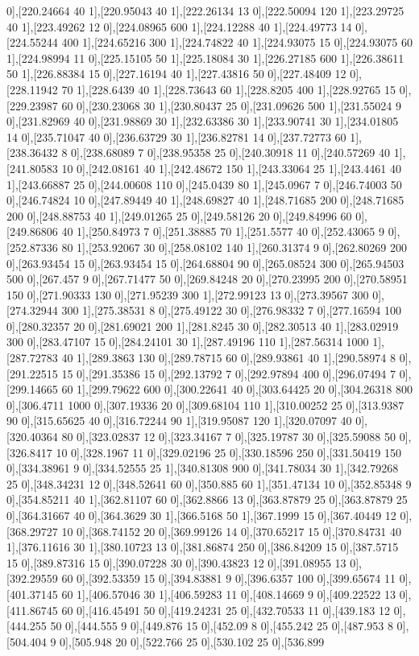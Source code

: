 {0],[220.24664 40 1],[220.95043 40 1],[222.26134 13 0],[222.50094 120 1],[223.29725 40 1],[223.49262 12 0],[224.08965 600 1],[224.12288 40 1],[224.49773 14 0],[224.55244 400 1],[224.65216 300 1],[224.74822 40 1],[224.93075 15 0],[224.93075 60 1],[224.98994 11 0],[225.15105 50 1],[225.18084 30 1],[226.27185 600 1],[226.38611 50 1],[226.88384 15 0],[227.16194 40 1],[227.43816 50 0],[227.48409 12 0],[228.11942 70 1],[228.6439 40 1],[228.73643 60 1],[228.8205 400 1],[228.92765 15 0],[229.23987 60 0],[230.23068 30 1],[230.80437 25 0],[231.09626 500 1],[231.55024 9 0],[231.82969 40 0],[231.98869 30 1],[232.63386 30 1],[233.90741 30 1],[234.01805 14 0],[235.71047 40 0],[236.63729 30 1],[236.82781 14 0],[237.72773 60 1],[238.36432 8 0],[238.68089 7 0],[238.95358 25 0],[240.30918 11 0],[240.57269 40 1],[241.80583 10 0],[242.08161 40 1],[242.48672 150 1],[243.33064 25 1],[243.4461 40 1],[243.66887 25 0],[244.00608 110 0],[245.0439 80 1],[245.0967 7 0],[246.74003 50 0],[246.74824 10 0],[247.89449 40 1],[248.69827 40 1],[248.71685 200 0],[248.71685 200 0],[248.88753 40 1],[249.01265 25 0],[249.58126 20 0],[249.84996 60 0],[249.86806 40 1],[250.84973 7 0],[251.38885 70 1],[251.5577 40 0],[252.43065 9 0],[252.87336 80 1],[253.92067 30 0],[258.08102 140 1],[260.31374 9 0],[262.80269 200 0],[263.93454 15 0],[263.93454 15 0],[264.68804 90 0],[265.08524 300 0],[265.94503 500 0],[267.457 9 0],[267.71477 50 0],[269.84248 20 0],[270.23995 200 0],[270.58951 150 0],[271.90333 130 0],[271.95239 300 1],[272.99123 13 0],[273.39567 300 0],[274.32944 300 1],[275.38531 8 0],[275.49122 30 0],[276.98332 7 0],[277.16594 100 0],[280.32357 20 0],[281.69021 200 1],[281.8245 30 0],[282.30513 40 1],[283.02919 300 0],[283.47107 15 0],[284.24101 30 1],[287.49196 110 1],[287.56314 1000 1],[287.72783 40 1],[289.3863 130 0],[289.78715 60 0],[289.93861 40 1],[290.58974 8 0],[291.22515 15 0],[291.35386 15 0],[292.13792 7 0],[292.97894 400 0],[296.07494 7 0],[299.14665 60 1],[299.79622 600 0],[300.22641 40 0],[303.64425 20 0],[304.26318 800 0],[306.4711 1000 0],[307.19336 20 0],[309.68104 110 1],[310.00252 25 0],[313.9387 90 0],[315.65625 40 0],[316.72244 90 1],[319.95087 120 1],[320.07097 40 0],[320.40364 80 0],[323.02837 12 0],[323.34167 7 0],[325.19787 30 0],[325.59088 50 0],[326.8417 10 0],[328.1967 11 0],[329.02196 25 0],[330.18596 250 0],[331.50419 150 0],[334.38961 9 0],[334.52555 25 1],[340.81308 900 0],[341.78034 30 1],[342.79268 25 0],[348.34231 12 0],[348.52641 60 0],[350.885 60 1],[351.47134 10 0],[352.85348 9 0],[354.85211 40 1],[362.81107 60 0],[362.8866 13 0],[363.87879 25 0],[363.87879 25 0],[364.31667 40 0],[364.3629 30 1],[366.5168 50 1],[367.1999 15 0],[367.40449 12 0],[368.29727 10 0],[368.74152 20 0],[369.99126 14 0],[370.65217 15 0],[370.84731 40 1],[376.11616 30 1],[380.10723 13 0],[381.86874 250 0],[386.84209 15 0],[387.5715 15 0],[389.87316 15 0],[390.07228 30 0],[390.43823 12 0],[391.08955 13 0],[392.29559 60 0],[392.53359 15 0],[394.83881 9 0],[396.6357 100 0],[399.65674 11 0],[401.37145 60 1],[406.57046 30 1],[406.59283 11 0],[408.14669 9 0],[409.22522 13 0],[411.86745 60 0],[416.45491 50 0],[419.24231 25 0],[432.70533 11 0],[439.183 12 0],[444.255 50 0],[444.555 9 0],[449.876 15 0],[452.09 8 0],[455.242 25 0],[487.953 8 0],[504.404 9 0],[505.948 20 0],[522.766 25 0],[530.102 25 0],[536.899 }
